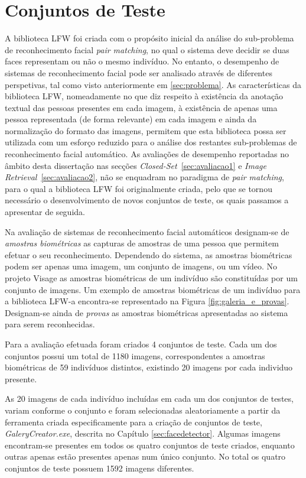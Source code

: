 \section{Conjuntos de Teste}  \label{sec:conjuntos}
A biblioteca LFW foi criada com o propósito inicial da análise do sub-problema de reconhecimento facial \textit{pair matching}, no qual o sistema deve decidir se duas faces representam ou não o mesmo indivíduo. No entanto, o desempenho de sistemas de reconhecimento facial pode ser analisado através de diferentes perspetivas, tal como visto anteriormente em \ref{sec:problema}. As características da biblioteca LFW, nomeadamente no que diz respeito à existência da anotação textual das pessoas presentes em cada imagem, à existência de apenas uma pessoa representada (de forma relevante) em cada imagem e ainda da normalização do formato das imagens, permitem que esta biblioteca possa ser utilizada com um esforço reduzido para o análise dos restantes sub-problemas de reconhecimento facial automático. As avaliações de desempenho reportadas no âmbito desta dissertação nas secções \textit{Closed-Set}~\ref{sec:avaliacao1} e \textit{Image Retrieval}~\ref{sec:avaliacao2}, não se enquadram no paradigma de \textit{pair matching}, para o qual a biblioteca LFW foi originalmente criada, pelo que se tornou necessário o desenvolvimento de novos conjuntos de teste, os quais passamos a apresentar de seguida.

Na avaliação de sistemas de reconhecimento facial automáticos designam-se de \textit{amostras biométricas} as capturas de amostras de uma pessoa que permitem efetuar o seu reconhecimento. Dependendo do sistema, as amostras biométricas podem ser apenas uma imagem, um conjunto de imagens, ou um vídeo. No projeto Visage as amostras biométricas de um indivíduo são constituídas por um conjunto de imagens. Um exemplo de amostras biométricas de um indivíduo para a biblioteca LFW-a encontra-se representado na Figura \ref{fig:galeria_e_provas}. Designam-se ainda de \textit{provas} as amostras biométricas apresentadas ao sistema para serem reconhecidas.

Para a avaliação efetuada foram criados 4 conjuntos de teste. Cada um dos conjuntos possui um total de 1180 imagens, correspondentes a amostras biométricas de 59 indivíduos distintos, existindo 20 imagens por cada individuo presente. 

As 20 imagens de cada indivíduo incluídas em cada um dos conjuntos de testes, variam conforme o conjunto e foram selecionadas aleatoriamente a partir da ferramenta criada especificamente para a criação de conjuntos de teste, \textit{GaleryCreator.exe}, descrita no Capítulo \ref{sec:facedetector}. Algumas imagens encontram-se presentes em todos os quatro conjuntos de teste criados, enquanto outras apenas estão presentes apenas num único conjunto. No total os quatro conjuntos de teste possuem 1592 imagens diferentes.

